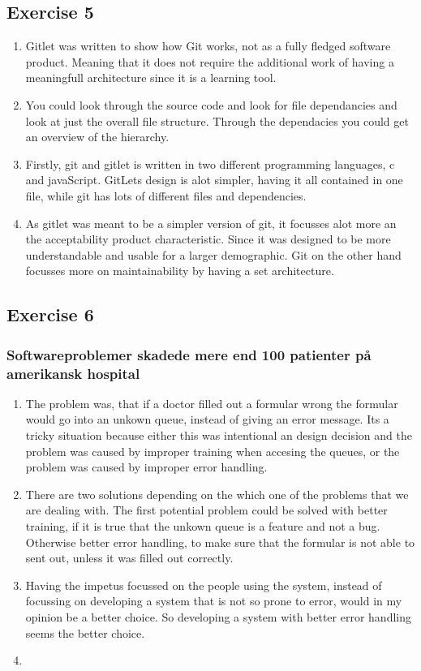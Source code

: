 \documentclass{article}
\begin{document}
\subsection*{Exercise 5}
\begin{enumerate}
    \item Gitlet was written to show how Git works, not as a fully fledged software product. Meaning that it does not require the additional work of having a meaningfull architecture since it is a learning tool.
    \item You could look through the source code and look for file dependancies and look at just the overall file structure. Through the dependacies you could get an overview of the hierarchy.
    \item Firstly, git and gitlet is written in two different programming languages, c and javaScript. GitLets design is alot simpler, having it all contained in one file, while git has lots of different files and dependencies.
    \item As gitlet was meant to be a simpler version of git, it focusses alot more an the acceptability product characteristic. Since it was designed to be more understandable and usable for a larger demographic. 
    Git on the other hand focusses more on maintainability by having a set architecture.
\end{enumerate}
\subsection*{Exercise 6}
\subsubsection*{Softwareproblemer skadede mere end 100 patienter på amerikansk hospital}
\begin{enumerate}
    \item The problem was, that if a doctor filled out a formular wrong the formular would go into an unkown queue, instead of giving an error message. Its a tricky situation because either this was intentional an design decision and the problem was caused by improper training when accesing the queues, or the problem was caused by improper error handling.
    \item There are two solutions depending on the which one of the problems that we are dealing with. The first potential problem could be solved with better training, if it is true that the unkown queue is a feature and not a bug. Otherwise better error handling, to make sure that the formular is not able to sent out, unless it was filled out correctly.
    \item Having the impetus focussed on the people using the system, instead of focussing on developing a system that is not so prone to error, would in my opinion be a better choice. So developing a system with better error handling seems the better choice. 
    \item 
\end{enumerate}
\end{document}
